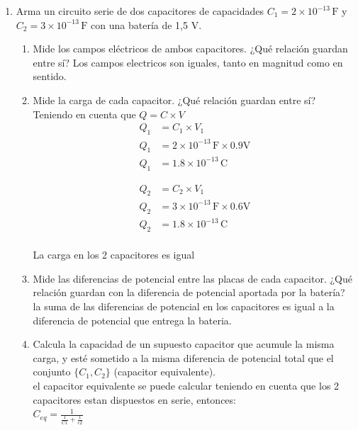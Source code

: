 \documentclass[12pt]{report}
\begin{document}
\begin{enumerate}
    \item Arma un circuito serie de dos capacitores de capacidades $C_1 = 2 \times 10^{-13} \, \text{F}$ y $C_2 = 3 \times 10^{-13} \, \text{F}$ con una batería de 1,5 V.
    \begin{enumerate}
        \item Mide los campos eléctricos de ambos capacitores. ¿Qué relación guardan entre sí?
            Los campos electricos son iguales, tanto en magnitud como en sentido.
        \item Mide la carga de cada capacitor. ¿Qué relación guardan entre sí?\\
            Teniendo en cuenta que $Q=C \times V$\\
            
            \begin{align*}
            Q_1&= C_1 \times V_1\\[6pt]
            Q_1&= 2 \times 10^{-13} \,\text{F} \times 0.9 \text{V}\\[6pt]
            Q_1&= 1.8\times 10^{-13} \,\text{C}
            \end{align*}

            \begin{align*}
            Q_2&= C_2 \times V_1\\[6pt]
            Q_2&= 3 \times 10^{-13} \,\text{F} \times 0.6 \text{V}\\[6pt]
            Q_2&= 1.8\times 10^{-13} \,\text{C}\\[12pt]
            \end{align*}
       
            La carga en los 2 capacitores es igual\\

        \item Mide las diferencias de potencial entre las placas de cada capacitor. ¿Qué relación guardan con la diferencia de potencial aportada por la batería?\\
            la suma de las diferencias de potencial en los capacitores es igual a la diferencia de potencial que entrega la bateria.\\
        \item Calcula la capacidad de un supuesto capacitor que acumule la misma carga, y esté sometido a la misma diferencia de potencial total que el conjunto $\{C_1, C_2\}$ (capacitor equivalente).\\
            el capacitor equivalente se puede calcular teniendo en cuenta que los 2 capacitores estan dispuestos en serie, entonces:\\
            $C_{eq}= \frac{1}{\frac{1}{C1}+\frac{1}{c2}}$\\


\end{enumerate}
\end{enumerate}
\end{document}
